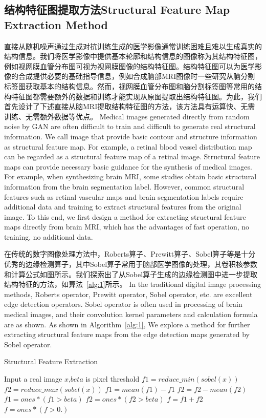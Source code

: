 \documentclass[letterpaper]{article} %
\begin{document}
\subsection{结构特征图提取方法Structural Feature Map Extraction Method}

直接从随机噪声通过生成对抗训练生成的医学影像通常训练困难且难以生成真实的结构信息。我们将医学影像中提供基本轮廓和结构信息的图像称为其结构特征图，例如视网膜血管分布图可视为视网膜图像的结构特征图\cite{41costa2017towards}。结构特征图可以为医学影像的合成提供必要的基础指导信息，例如合成脑部MRI图像时一些研究从脑分割标签图获取基本的结构信息\cite{4shin2018medical}。然而，视网膜血管分布图和脑分割标签图等常用的结构特征图都需要额外的数据和训练才能实现从原图提取出结构特征图。为此，我们首先设计了下述直接从脑MRI提取结构特征图的方法，该方法具有运算快、无需训练、无需额外数据等优点。
Medical images generated directly from random noise by GAN are often difficult to train and difficult to generate real structural information. We call image that provide basic contour and structure information as structural feature map. For example, a retinal blood vessel distribution map can be regarded as a structural feature map of a retinal image\cite{41costa2017towards}. Structural feature maps can provide necessary basic guidance for the synthesis of medical images. For example, when synthesizing brain MRI, some studies obtain basic structural information from the brain segmentation label\cite{4shin2018medical}. However, common structural features such as retinal vascular maps and brain segmentation labels require additional data and training to extract structural features from the original image. To this end, we first design a method for extracting structural feature maps directly from brain MRI, which has the advantages of fast operation, no training, no additional data. 

在传统的数字图像处理方法中，Roberts算子\cite{87Roberts}、Prewitt算子\cite{88prewitt}、Sobel算子\cite{89Sobel}等是十分优秀的边缘检测算子，其中Sobel算子常用于脑部医学图像的处理，其卷积核参数和计算公式如图所示。我们探索出了从Sobel算子生成的边缘检测图中进一步提取结构特征的方法，如算法~\ref{alg:1}所示。
In the traditional digital image processing methods, Roberts operator, Prewitt operator, Sobel operator, etc. are excellent edge detection operators. Sobel operator is often used in processing of brain medical images, and their convolution kernel parameters and calculation formula are as shown. As shown in Algorithm~\ref{alg:1}, We explore a method for further extracting structural feature maps from the edge detection maps generated by Sobel operator.
\begin{algorithm}
	\caption{Structural Feature Extraction}
	\label{alg:1}
	\begin{algorithmic}[1]
		\State Input a real image $x$,$beta$ is pixel threshold
		\State $f1 = reduce\_min(sobel(x))$
		\State $f2 = reduce\_max(sobel(x))$
		\State $f1 = mean(f1) - f1$
		\State $f2 = f2 - mean(f2)$
		\State $f1 = ones * (f1 > beta)$
		\State $f2 = ones * (f2 > beta)$
		\State $f = f1 + f2$
		\State $f = ones * (f > 0.)$
	\end{algorithmic}  
\end{algorithm}
\end{document}
